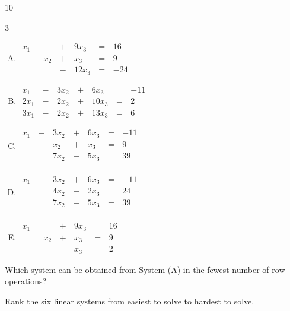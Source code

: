 \begin{applicationActivities}
\begin{activity}{10}
\begin{multicols}{3}
\begin{enumerate}[(A)]
	\item \(
		\begin{alignedat}{4}
	   		x_1 &     &      &\,+\,& 9x_3 &\,=\,& 16 \\
	       		&     & x_2 &\,+\,& x_3 &\,=\,& 9 \\
	       		&     &      &\,-\,& 12x_3 &\,=\,& -24
		\end{alignedat}
	\)

   \item \(
		\begin{alignedat}{4}
    		x_1 &\,-\,& 3x_2 &\,+\,&  6x_3 &\,=\,& -11 \\
		   2x_1 &\,-\,& 2x_2 &\,+\,& 10x_3 &\,=\,& 2 \\
		   3x_1 &\,-\,& 2x_2 &\,+\,& 13x_3 &\,=\,& 6
    	\end{alignedat}
	\)


   	\item \(
		\begin{alignedat}{4}
	   		x_1 &\,-\,& 3x_2 &\,+\,& 6x_3 &\,=\,& -11 \\
	   		    &     & x_2 &\,+\,& x_3 &\,=\,& 9 \\
	   		    &     & 7x_2 &\,-\,& 5x_3 &\,=\,& 39 \\
		\end{alignedat}
	\)

   	\item \(
		\begin{alignedat}{4}
	   		x_1 &\,-\,& 3x_2 &\,+\,& 6x_3 &\,=\,& -11 \\
	   		    &     & 4x_2 &\,-\,& 2x_3 &\,=\,& 24 \\
	   		    &     & 7x_2 &\,-\,& 5x_3 &\,=\,& 39 \\
		\end{alignedat}
	\)



	\item \(
		\begin{alignedat}{4}
	   		x_1 &     &      &\,+\,& 9x_3 &\,=\,& 16 \\
	       		&     & x_2 &\,+\,& x_3 &\,=\,& 9 \\
	       		&     &      &\,\,& x_3 &\,=\,& 2
		\end{alignedat}
	\)
	\end{enumerate}
    \end{multicols}
  \begin{subactivity}
	Which system can be obtained from System (A) in the fewest number of row operations?
  \end{subactivity}
  \begin{subactivity}
    Rank the six linear systems from easiest to solve to hardest to solve.
  \end{subactivity}
\end{activity}


\end{applicationActivities}
